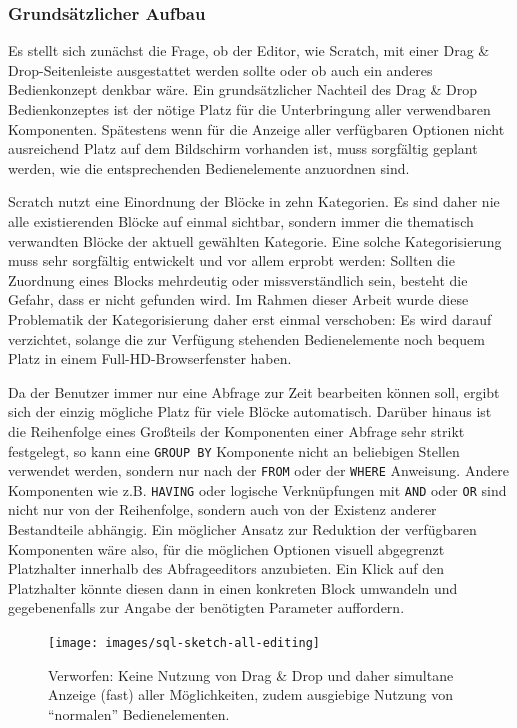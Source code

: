 \subsubsection{Grundsätzlicher Aufbau}

Es stellt sich zunächst die Frage, ob der Editor, wie Scratch, mit einer Drag \& Drop-Seitenleiste ausgestattet werden sollte oder ob auch ein anderes Bedienkonzept denkbar wäre. Ein grundsätzlicher Nachteil des Drag \& Drop Bedienkonzeptes ist der nötige Platz für die Unterbringung aller verwendbaren Komponenten. Spätestens wenn für die Anzeige aller verfügbaren Optionen nicht ausreichend Platz auf dem Bildschirm vorhanden ist, muss sorgfältig geplant werden, wie die entsprechenden Bedienelemente anzuordnen sind.

Scratch nutzt eine Einordnung der Blöcke in zehn Kategorien. Es sind daher nie alle existierenden Blöcke auf einmal sichtbar, sondern immer die thematisch verwandten Blöcke der aktuell gewählten Kategorie. Eine solche Kategorisierung muss sehr sorgfältig entwickelt und vor allem erprobt werden: Sollten die Zuordnung eines Blocks mehrdeutig oder missverständlich sein, besteht die Gefahr, dass er nicht gefunden wird. Im Rahmen dieser Arbeit wurde diese Problematik der Kategorisierung daher erst einmal verschoben: Es wird darauf verzichtet, solange die zur Verfügung stehenden Bedienelemente noch bequem Platz in einem Full-HD-Browserfenster haben.

Da der Benutzer immer nur eine Abfrage zur Zeit bearbeiten können soll, ergibt sich der einzig mögliche Platz für viele Blöcke automatisch. Darüber hinaus ist die Reihenfolge eines Großteils der Komponenten einer Abfrage sehr strikt festgelegt, so kann eine \texttt{GROUP BY} Komponente nicht an beliebigen Stellen verwendet werden, sondern nur nach der \texttt{FROM} oder der \texttt{WHERE} Anweisung. Andere Komponenten wie z.B. \texttt{HAVING} oder logische Verknüpfungen mit \texttt{AND} oder \texttt{OR} sind nicht nur von der Reihenfolge, sondern auch von der Existenz anderer Bestandteile abhängig. Ein möglicher Ansatz zur Reduktion der verfügbaren Komponenten wäre also, für die möglichen Optionen visuell abgegrenzt Platzhalter innerhalb des Abfrageeditors anzubieten. Ein Klick auf den Platzhalter könnte diesen dann in einen konkreten Block umwandeln und gegebenenfalls zur Angabe der benötigten Parameter auffordern.

\begin{figure}[p]
  \centering\texttt{[image: images/sql-sketch-all-editing]}
  \caption{Verworfen: Keine Nutzung von Drag \& Drop und daher simultane Anzeige (fast) aller Möglichkeiten, zudem ausgiebige Nutzung von "`normalen"' Bedienelementen.}
  \label{fig:screen-sql-editor-all-editing}
\end{figure}

